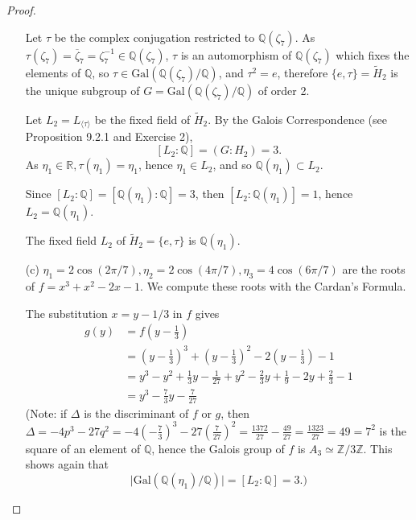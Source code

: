 \documentclass[11pt,a4paper]{article}
\newcommand{\Q}{\mathbb{Q}}
\newcommand{\Z}{\mathbb{Z}}
\newcommand{\R}{\mathbb{R}}
\newcommand{\Gal}{\mathrm{Gal}}
\begin{document}
\begin{proof}
\begin{enumerate}
Let $\tau$ be the complex conjugation restricted to $\Q(\zeta_7)$. As $\tau(\zeta_7)  = \overline{\zeta}_7 = \zeta_7^{-1} \in \Q(\zeta_7)$, $\tau$ is an automorphism of $\Q(\zeta_7)$ which fixes the elements of $\Q$, so $\tau \in \Gal(\Q(\zeta_7)/\Q)$, and $\tau^2 = e$, therefore $\{e,\tau\} = \tilde{H}_2$ is the unique subgroup of $G = \Gal(\Q(\zeta_7)/\Q)$ of order 2.

Let $L_2 = L_{\langle\tau\rangle}$ be the fixed field of $\tilde{H}_2$.
By the Galois Correspondence (see Proposition 9.2.1 and Exercise 2), 
$$[L_2 : \Q] = (G: H_2) =3.$$
As $\eta_1 \in \R, \tau(\eta_1) = \eta_1$, hence $\eta_1 \in L_2$, and so $\Q(\eta_1) \subset L_2$. 

Since $[L_2:\Q] = [\Q(\eta_1):\Q] = 3$, then $[L_2 : \Q(\eta_1)] = 1$, hence $L_2 = \Q(\eta_1)$.
\begin{center}
The fixed field $L_2$ of $\tilde{H}_2 = \{e,\tau\}$ is $\Q(\eta_1)$.
\end{center}

\item[(c)] $\eta_1=2 \cos(2\pi/7), \eta_2 = 2\cos(4\pi/7),\eta_3 = 4 \cos(6 \pi/7)$ are the roots of $f = x^3+x^2-2x-1$. We compute these roots with the Cardan's Formula.

The substitution $x=y-1/3$ in $f$ gives
\begin{align*}
g(y) &= f\left(y - \frac{1}{3}\right)\\
& = \left(y - \frac{1}{3}\right)^3+  \left(y - \frac{1}{3}\right)^2-2\left(y - \frac{1}{3}\right)-1\\
&=y^3-y^2+\frac{1}{3}y-\frac{1}{27}+y^2-\frac{2}{3}y+\frac{1}{9} - 2y +\frac{2}{3} - 1\\
&=y^3 - \frac{7}{3} y - \frac{7}{27}
\end{align*}
(Note: if $\Delta$ is the discriminant of $f$ or $g$, then $\Delta = -4p^3-27q^2 = -4\left(-\frac{7}{3}\right)^3 - 27 \left(\frac{7}{27}\right)^2 = \frac{1372}{27} - \frac{49}{27} = \frac{1323}{27} = 49 = 7^2$ is the square of an element of $\Q$, hence the Galois group of $f$ is $A_3\simeq \Z/3\Z$. This shows again that $$\vert \Gal(\Q(\eta_1) / \Q) \vert = [L_2 : \Q] = 3.)$$


\end{enumerate}
\end{proof}
\end{document}

